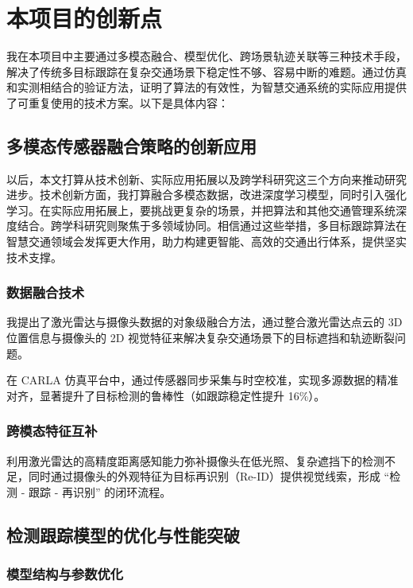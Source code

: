 \chapter{本项目的创新点}

我在本项目中主要通过多模态融合、模型优化、跨场景轨迹关联等三种技术手段，解决了传统多目标跟踪在复杂交通场景下稳定性不够、容易中断的难题。通过仿真和实测相结合的验证方法，证明了算法的有效性，为智慧交通系统的实际应用提供了可重复使用的技术方案。以下是具体内容：



\section{多模态传感器融合策略的创新应用}

以后，本文打算从技术创新、实际应用拓展以及跨学科研究这三个方向来推动研究进步。技术创新方面，我打算融合多模态数据，改进深度学习模型，同时引入强化学习。在实际应用拓展上，要挑战更复杂的场景，并把算法和其他交通管理系统深度结合。跨学科研究则聚焦于多领域协同。相信通过这些举措，多目标跟踪算法在智慧交通领域会发挥更大作用，助力构建更智能、高效的交通出行体系，提供坚实技术支撑。


\subsection{数据融合技术}

我提出了激光雷达与摄像头数据的对象级融合方法，通过整合激光雷达点云的 3D 位置信息与摄像头的 2D 视觉特征来解决复杂交通场景下的目标遮挡和轨迹断裂问题。

在 CARLA 仿真平台中，通过传感器同步采集与时空校准，实现多源数据的精准对齐，显著提升了目标检测的鲁棒性（如跟踪稳定性提升 16\%）。

\subsection{跨模态特征互补}

利用激光雷达的高精度距离感知能力弥补摄像头在低光照、复杂遮挡下的检测不足，同时通过摄像头的外观特征为目标再识别（Re-ID）提供视觉线索，形成 “检测 - 跟踪 - 再识别” 的闭环流程。



\section{检测跟踪模型的优化与性能突破}

\subsection{模型结构与参数优化}

